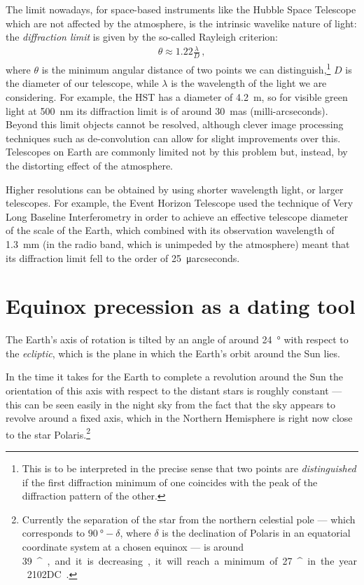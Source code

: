 \documentclass[main.tex]{subfiles}
\begin{document}
The limit nowadays, for space-based instruments like the Hubble Space Telescope which are not affected by the atmosphere, is the intrinsic wavelike nature of light: the \emph{diffraction limit} is given by the so-called Rayleigh criterion:
%
\begin{align}
\theta \approx \num{1.22} \frac{\lambda }{D}
\,,
\end{align}
%
where \(\theta \) is the minimum angular distance of two points we can distinguish,\footnote{This is to be interpreted in the precise sense that two points are \emph{distinguished} if the first diffraction minimum of one coincides with the peak of the diffraction pattern of the other.} \(D\) is the diameter of our telescope, while \(\lambda \) is the wavelength of the light we are considering.
For example, the HST has a diameter of \SI{4.2}{m}, so for visible green light at \SI{500}{nm} its diffraction limit is of around \SI{30}{mas} (milli-arcseconds).
Beyond this limit objects cannot be resolved, although clever image processing techniques such as de-convolution can allow for slight improvements over this. 
Telescopes on Earth are commonly limited not by this problem but, instead, by the distorting effect of the atmosphere. 

Higher resolutions can be obtained by using shorter wavelength light, or larger telescopes. 
For example, the Event Horizon Telescope \cite[]{theeventhorizontelescopecollaborationFirstM87Event2019} used the technique of Very Long Baseline Interferometry in order to achieve an effective telescope diameter of the scale of the Earth, which combined with its observation wavelength of \SI{1.3}{mm} (in the radio band, which is unimpeded by the atmosphere) meant that its diffraction limit fell to the order of \SI{25}{\micro arcseconds}.

\section{Equinox precession as a dating tool}

The Earth's axis of rotation is tilted by an angle of around \SI{24}{\degree} with respect to the \emph{ecliptic}, which is the plane in which the Earth's orbit around the Sun lies. 

In the time it takes for the Earth to complete a revolution around the Sun the orientation of this axis with respect to the distant stars is roughly constant --- this can be seen easily in the night sky from the fact that the sky appears to revolve around a fixed axis, which in the Northern Hemisphere is right now close to the star Polaris.\footnote{Currently the separation of the star from the northern celestial pole --- which corresponds to \(\SI{90}{\degree} - \delta \), where \(\delta \) is the declination of Polaris in an equatorial coordinate system at a chosen equinox --- is around \SI{39}{^\prime}, and it is decreasing, it will reach a minimum of \SI{27}{^\prime} in the year 2102DC \cite[pag.\ 58]{barbieriLezioniDiAstronomia2003}.}
\end{document}
